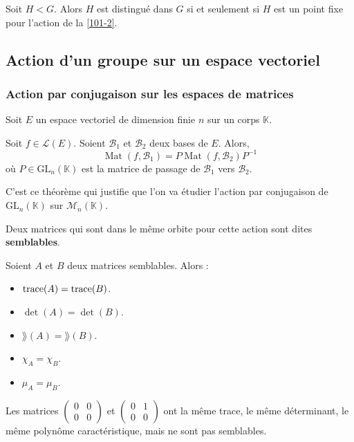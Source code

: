 	\begin{proposition}
		Soit $H < G$. Alors $H$ est distingué dans $G$ si et seulement si $H$ est un point fixe pour l'action de la \cref{101-2}.
	\end{proposition}
	
	\subsection{Action d'un groupe sur un espace vectoriel}
	
	\subsubsection{Action par conjugaison sur les espaces de matrices}
	
	Soit $E$ un espace vectoriel de dimension finie $n$ sur un corps $\mathbb{K}$.
	
	
	\begin{theorem}
		Soit $f \in \mathcal{L}(E)$. Soient $\mathcal{B}_1$ et $\mathcal{B}_2$ deux bases de $E$. Alors,
		\[ \operatorname{Mat}(f, \mathcal{B}_1) = P \operatorname{Mat}(f, \mathcal{B}_2) P^{-1} \]
		où $P \in \mathrm{GL}_n(\mathbb{K})$ est la matrice de passage de $\mathcal{B}_1$ vers $\mathcal{B}_2$.
	\end{theorem}

	C'est ce théorème qui justifie que l'on va étudier l'action par conjugaison de $\mathrm{GL}_n(\mathbb{K})$ sur $\mathcal{M}_n(\mathbb{K})$.
	
	\begin{definition}
		Deux matrices qui sont dans le même orbite pour cette action sont dites \textbf{semblables}.
	\end{definition}
	
	\begin{theorem}
		Soient $A$ et $B$ deux matrices semblables. Alors :
		\begin{itemize}
			\item $\operatorname{trace}(A) = \operatorname{trace}(B)$.
			\item $\det(A) = \det(B)$.
			\item $\rang(A) = \rang(B)$.
			\item $\chi_A = \chi_B$.
			\item $\mu_A = \mu_B$.
		\end{itemize}
	\end{theorem}

	\begin{cexample}
		Les matrices $\begin{pmatrix} 0 & 0 \\ 0 & 0\end{pmatrix}$ et $\begin{pmatrix} 0 & 1 \\ 0 & 0\end{pmatrix}$ ont la même trace, le même déterminant, le même polynôme caractéristique, mais ne sont pas semblables.
	\end{cexample}

